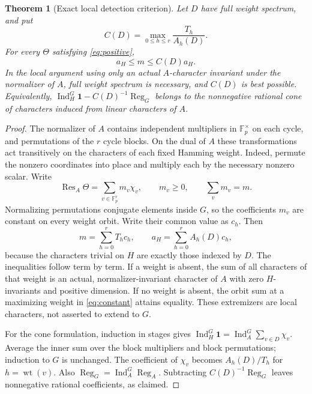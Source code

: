 \documentclass[11pt]{article}
\newtheorem{theorem}{Theorem}[section]
\theoremstyle{remark}\newtheorem{remark}[theorem]{Remark}
\newcommand{\Ind}{\operatorname{Ind}}
\newcommand{\Res}{\operatorname{Res}}
\newcommand{\Reg}{\operatorname{Reg}}
\newcommand{\wt}{\operatorname{wt}}
\newcommand{\F}{\mathbb F}
\newcommand{\one}{\mathbf{1}}
\begin{document}
\begin{theorem}[Exact local detection criterion]\label{thm:local}
Let $D$ have full weight spectrum, and put
\begin{equation}\label{eq:constant}
 C(D)=\max_{0\le h\le r}\frac{T_h}{A_h(D)}.
\end{equation}
For every $\Theta$ satisfying \eqref{eq:positive},
\begin{equation}\label{eq:detector}
 a_H\le m\le C(D)a_H.
\end{equation}
In the local argument using only an actual $A$-character invariant under the normalizer of $A$, full weight spectrum is necessary, and $C(D)$ is best possible. Equivalently, $\Ind_H^G\one-C(D)^{-1}\Reg_G$ belongs to the nonnegative rational cone of characters induced from linear characters of $A$.
\end{theorem}
\begin{proof}
The normalizer of $A$ contains independent multipliers in $\F_p^\times$ on each cycle, and permutations of the $r$ cycle blocks. On the dual of $A$ these transformations act transitively on the characters of each fixed Hamming weight. Indeed, permute the nonzero coordinates into place and multiply each by the necessary nonzero scalar. Write
\[
 \Res_A\Theta=\sum_{v\in\F_p^r}m_v\chi_v,\qquad m_v\ge0,\qquad \sum_v m_v=m.
\]
Normalizing permutations conjugate elements inside $G$, so the coefficients $m_v$ are constant on every weight orbit. Write their common value as $c_h$. Then
\[
 m=\sum_{h=0}^r T_hc_h,\qquad a_H=\sum_{h=0}^r A_h(D)c_h,
\]
because the characters trivial on $H$ are exactly those indexed by $D$. The inequalities follow term by term. If a weight is absent, the sum of all characters of that weight is an actual, normalizer-invariant character of $A$ with zero $H$-invariants and positive dimension. If no weight is absent, the orbit sum at a maximizing weight in \eqref{eq:constant} attains equality. These extremizers are local characters, not asserted to extend to $G$.

For the cone formulation, induction in stages gives $\Ind_H^G\one=\Ind_A^G\sum_{v\in D}\chi_v$. Average the inner sum over the block multipliers and block permutations; induction to $G$ is unchanged. The coefficient of $\chi_v$ becomes $A_h(D)/T_h$ for $h=\wt(v)$. Also $\Reg_G=\Ind_A^G\Reg_A$. Subtracting $C(D)^{-1}\Reg_G$ leaves nonnegative rational coefficients, as claimed.
\end{proof}
\end{document}
